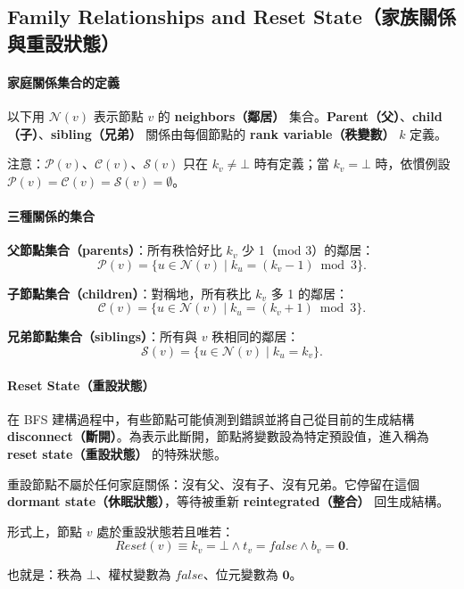 \documentclass[a4paper, 12pt]{article}
\newcommand{\Pa}{\mathcal{P}}
\newcommand{\Ch}{\mathcal{C}}
\newcommand{\Si}{\mathcal{S}}
\newcommand{\bz}{\mathbf{0}}
\newcommand{\rk}{k}
\begin{document}
\subsection{Family Relationships and Reset State（家族關係與重設狀態）}
\label{subsec:family}

\paragraph{家庭關係集合的定義}
以下用 \(\mathcal{N}(v)\) 表示節點 \(v\) 的 \textbf{neighbors（鄰居）} 集合。\textbf{Parent（父）}、\textbf{child（子）}、\textbf{sibling（兄弟）} 關係由每個節點的 \textbf{rank variable（秩變數）} \(\rk\) 定義。

注意：\(\Pa(v)\)、\(\Ch(v)\)、\(\Si(v)\) 只在 \(\rk_v\neq\bot\) 時有定義；當 \(\rk_v=\bot\) 時，依慣例設 \(\Pa(v)=\Ch(v)=\Si(v)=\emptyset\)。

\paragraph{三種關係的集合}
\textbf{父節點集合（parents）}：所有秩恰好比 \(\rk_v\) 少 1（mod 3）的鄰居：
\[
\Pa(v)=\{u\in\mathcal{N}(v)\mid \rk_u=(\rk_v-1)\bmod 3\}.
\]

\textbf{子節點集合（children）}：對稱地，所有秩比 \(\rk_v\) 多 1 的鄰居：
\[
\Ch(v)=\{u\in\mathcal{N}(v)\mid \rk_u=(\rk_v+1)\bmod 3\}.
\]

\textbf{兄弟節點集合（siblings）}：所有與 \(v\) 秩相同的鄰居：
\[
\Si(v)=\{u\in\mathcal{N}(v)\mid \rk_u=\rk_v\}.
\]

\paragraph{Reset State（重設狀態）}
在 BFS 建構過程中，有些節點可能偵測到錯誤並將自己從目前的生成結構 \textbf{disconnect（斷開）}。為表示此斷開，節點將變數設為特定預設值，進入稱為 \textbf{reset state（重設狀態）} 的特殊狀態。

重設節點不屬於任何家庭關係：沒有父、沒有子、沒有兄弟。它停留在這個 \textbf{dormant state（休眠狀態）}，等待被重新 \textbf{reintegrated（整合）} 回生成結構。

形式上，節點 \(v\) 處於重設狀態若且唯若：
\[
Reset(v)\equiv \rk_v=\bot \wedge t_v=\mathit{false} \wedge b_v=\bz.
\]

也就是：秩為 \(\bot\)、權杖變數為 \(\mathit{false}\)、位元變數為 \(\bz\)。
\end{document}
